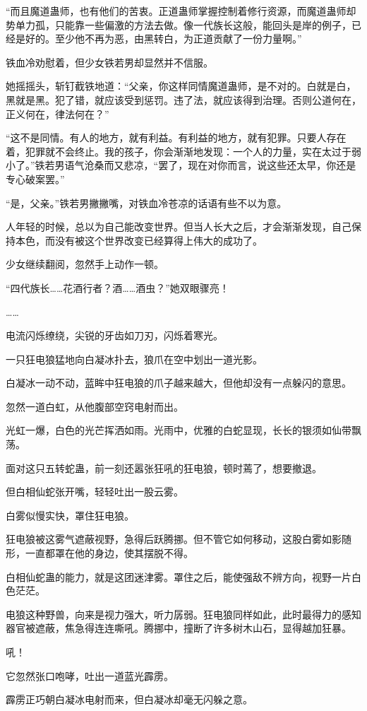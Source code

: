 \begin{this_body}
“而且魔道蛊师，也有他们的苦衷。正道蛊师掌握控制着修行资源，而魔道蛊师却势单力孤，只能靠一些偏激的方法去做。像一代族长这般，能回头是岸的例子，已经是好的。至少他不再为恶，由黑转白，为正道贡献了一份力量啊。”

铁血冷劝慰着，但少女铁若男却显然并不信服。

她摇摇头，斩钉截铁地道：“父亲，你这样同情魔道蛊师，是不对的。白就是白，黑就是黑。犯了错，就应该受到惩罚。违了法，就应该得到治理。否则公道何在，正义何在，律法何在？”

“这不是同情。有人的地方，就有利益。有利益的地方，就有犯罪。只要人存在着，犯罪就不会终止。我的孩子，你会渐渐地发现：一个人的力量，实在太过于弱小了。”铁若男语气沧桑而又悲凉，“罢了，现在对你而言，说这些还太早，你还是专心破案罢。”

“是，父亲。”铁若男撇撇嘴，对铁血冷苍凉的话语有些不以为意。

人年轻的时候，总以为自己能改变世界。但当人长大之后，才会渐渐发现，自己保持本色，而没有被这个世界改变已经算得上伟大的成功了。

少女继续翻阅，忽然手上动作一顿。

“四代族长……花酒行者？酒……酒虫？”她双眼骤亮！

……

电流闪烁缭绕，尖锐的牙齿如刀刃，闪烁着寒光。

一只狂电狼猛地向白凝冰扑去，狼爪在空中划出一道光影。

白凝冰一动不动，蓝眸中狂电狼的爪子越来越大，但他却没有一点躲闪的意思。

忽然一道白虹，从他腹部空窍电射而出。

光虹一爆，白色的光芒挥洒如雨。光雨中，优雅的白蛇显现，长长的银须如仙带飘荡。

面对这只五转蛇蛊，前一刻还嚣张狂吼的狂电狼，顿时蔫了，想要撤退。

但白相仙蛇张开嘴，轻轻吐出一股云雾。

白雾似慢实快，罩住狂电狼。

狂电狼被这雾气遮蔽视野，急得后跃腾挪。但不管它如何移动，这股白雾如影随形，一直都罩在他的身边，使其摆脱不得。

白相仙蛇蛊的能力，就是这团迷津雾。罩住之后，能使强敌不辨方向，视野一片白色茫茫。

电狼这种野兽，向来是视力强大，听力孱弱。狂电狼同样如此，此时最得力的感知器官被遮蔽，焦急得连连嘶吼。腾挪中，撞断了许多树木山石，显得越加狂暴。

吼！

它忽然张口咆哮，吐出一道蓝光霹雳。

霹雳正巧朝白凝冰电射而来，但白凝冰却毫无闪躲之意。


\end{this_body}
